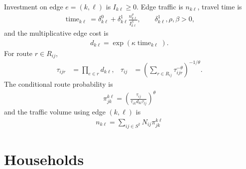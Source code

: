 \documentclass[12pt,a4paper]{article}
\newcommand{\1}{\mathbb 1}
\begin{document}
Investment on edge $e=(k,\ell)$ is $I_{k\ell}\geq0$. Edge traffic is $n_{k\ell}$, travel time is
\begin{align}
\operatorname{time}_{k\ell}
=
\delta_{k\ell}^0+
\delta_{k\ell}^1\frac{n_{k\ell}^{\rho}}{I_{k\ell}^{\beta}},
\qquad
\delta_{k\ell}^1,\rho,\beta>0,
\label{eq:edge-time}
\end{align}
and the multiplicative edge cost is
\begin{align}
d_{k\ell}=\exp\!\left(\kappa\operatorname{time}_{k\ell}\right).
\label{eq:edge-cost}
\end{align}
For route $r\in R_{ij}$,
\begin{align}
\tau_{ijr}&=\prod_{e\in r}d_{k\ell},
&
\tau_{ij}
&=
\left(\sum_{r\in R_{ij}}\tau_{ijr}^{-\theta}\right)^{-1/\theta}.
\label{eq:route-costs}
\end{align}
The conditional route probability is
\begin{align}
    \label{eq:edge-intensity}
    \pi_{jk}^{k\ell} = (\frac{\tau_{ij}}{\tau_{ik}d_{kl}\tau_{lj}})^{\theta}
\end{align}
and the traffic volume using edge $(k,\ell)$ is
\begin{align}
 n_{k\ell} = \sum_{ij \in S^{2}}N_{ij}\pi_{jk}^{k\ell}
\end{align}

\section{Households}
\end{document}
